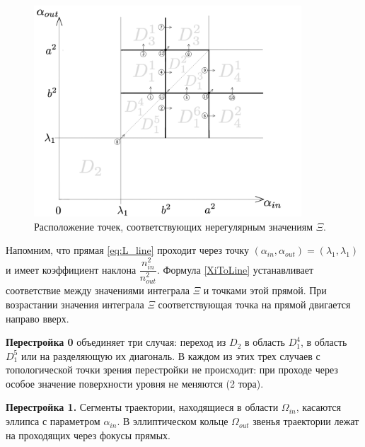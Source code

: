 \begin{figure}[!htb]
\centering
\includegraphics[width=10cm]{images/ch4/section2/diagramPlusIrregular.pdf}
    \caption{Расположение точек, соответствующих нерегулярным значениям $\Xi$.}
    \label{fig:pt9:_diagramPlusIrregular}
\end{figure}

Напомним, что прямая  \eqref{eq:L_line} проходит через точку $(\alpha_{in}, \alpha_{out}) = (\lambda_1, \lambda_1)$ и имеет коэффициент наклона $\dfrac{n_{in}^2}{n_{out}^2}$. Формула \eqref{XiToLine} устанавливает соответствие между значениями интеграла $\Xi$ и точками этой прямой. При возрастании значения интеграла $\Xi$ соответствующая точка на прямой двигается направо вверх. 

\textbf{Перестройка 0} объединяет три случая: переход из $D_2$ в область $D_1^4$, в область $D_1^5$ или на разделяющую их диагональ.
В каждом из этих трех случаев с топологической точки зрения перестройки не происходит: при проходе через особое значение поверхности уровня не меняются (2 тора). 

\textbf{Перестройка 1.} 
Сегменты траектории, находящиеся в области $\Omega_{in}$, касаются эллипса с параметром $\alpha_{in}$. 
В эллиптическом кольце $\Omega_{out}$ звенья траектории лежат на проходящих через фокусы прямых.

